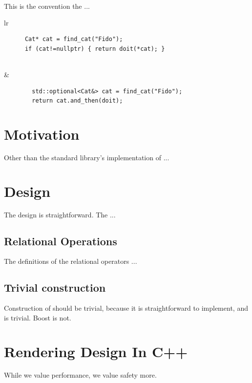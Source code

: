 \documentclass[a4paper,10pt,oneside,openany,final,article]{memoir}
\begin{document}
This is the convention the ...

\begin{tabular}{ lr }
  \begin{minipage}[t]{0.45\columnwidth}
    \begin{verbatim}
      Cat* cat = find_cat("Fido");
      if (cat!=nullptr) { return doit(*cat); }


    \end{verbatim}
  \end{minipage}
  &
    \begin{minipage}[t]{0.45\columnwidth}
      \begin{verbatim}
        std::optional<Cat&> cat = find_cat("Fido");
        return cat.and_then(doit);

      \end{verbatim}
    \end{minipage}
\end{tabular}


\chapter{Motivation}
Other than the standard library's implementation of ...

\chapter{Design}

The design is straightforward. The  ...

\section{Relational Operations}

The definitions of the relational operators ...

\section{Trivial construction}
Construction of  should be trivial, because it is straightforward to implement, and  is trivial.
Boost is not.

\chapter{Rendering Design In C++}

While we value performance, we value safety more.
\end{document}
